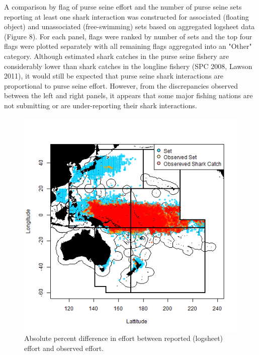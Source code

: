 \documentclass[12pt]{SCreport}
\begin{document}
A comparison by flag of purse seine effort and the number of purse seine sets reporting at least one shark interaction was constructed for associated (floating object) and unassociated (free-swimming) sets based on aggregated logsheet data (Figure 8).  For each panel, flags were ranked by number of sets and the top four flags were plotted separately with all remaining flags aggregated into an "Other" category. Although estimated shark catches in the purse seine fishery are considerably lower than shark catches in the longline fishery (SPC 2008, Lawson 2011), it would still be expected that purse seine shark interactions are proportional to purse seine effort. However, from the discrepancies observed between the left and right panels, it appears that some major fishing nations are not submitting or are under-reporting their shark interactions.

\begin{figure}
\begin{center}
\includegraphics[scale=0.75]{../GRAPHICS/Defined/FIG_07_PS_sets}
\caption{\label{fig:regions} Absolute percent difference in effort between reported (logsheet)  effort and observed effort.}
\end{center}
\end{figure}

 
\end{document}
